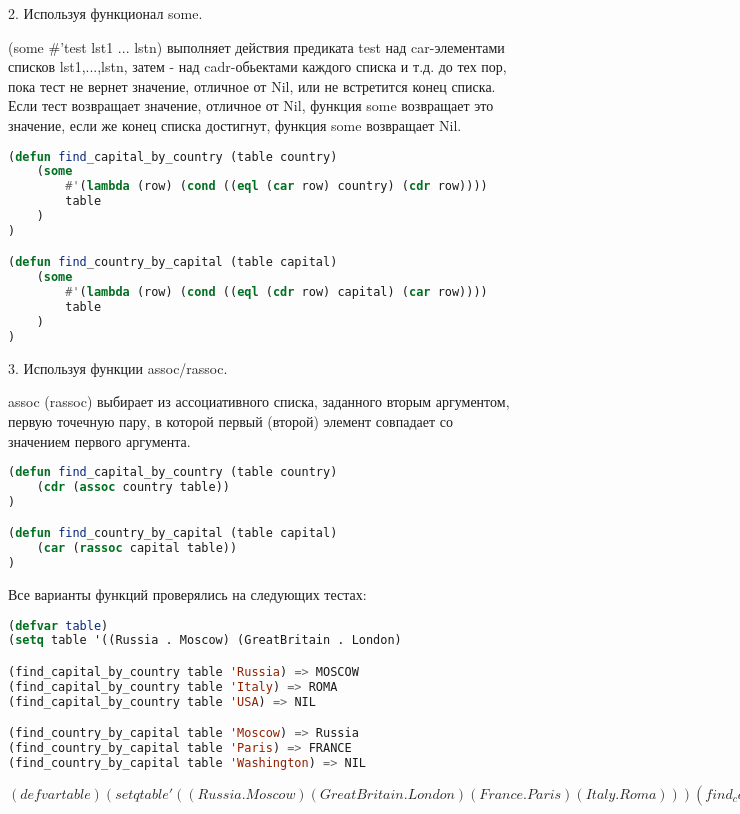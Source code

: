 \documentclass[12pt]{report}
\begin{document}
2. Используя функционал some.

(some \#'test lst1 ... lstn) выполняет действия предиката test над car-элементами списков lst1,...,lstn, затем - над cadr-обьектами каждого  списка и т.д. до тех пор, пока тест не вернет значение, отличное от Nil, или не встретится конец списка. Если тест возвращает значение, отличное от Nil, функция some возвращает это значение, если же конец списка достигнут, функция some возвращает Nil.

\begin{lstlisting}[language=Lisp]
(defun find_capital_by_country (table country)
	(some 
		#'(lambda (row) (cond ((eql (car row) country) (cdr row)))) 
		table
	) 
)

(defun find_country_by_capital (table capital)
	(some 
		#'(lambda (row) (cond ((eql (cdr row) capital) (car row)))) 
		table
	) 
)
\end{lstlisting}


3. Используя функции assoc/rassoc.

assoc (rassoc) выбирает из ассоциативного списка, заданного вторым аргументом, первую точечную пару, в которой первый (второй) элемент совпадает со значением первого аргумента. 

\begin{lstlisting}[language=Lisp]
(defun find_capital_by_country (table country)
	(cdr (assoc country table))
)

(defun find_country_by_capital (table capital)
	(car (rassoc capital table))
)
\end{lstlisting}

Все варианты функций проверялись на следующих тестах:
\begin{lstlisting}[language=Lisp]
(defvar table)
(setq table '((Russia . Moscow) (GreatBritain . London)                  (France . Paris) (Italy . Roma)))

(find_capital_by_country table 'Russia) => MOSCOW
(find_capital_by_country table 'Italy) => ROMA
(find_capital_by_country table 'USA) => NIL

(find_country_by_capital table 'Moscow) => Russia
(find_country_by_capital table 'Paris) => FRANCE
(find_country_by_capital table 'Washington) => NIL
\end{lstlisting}

$
(defvar table)
(setq table '((Russia . Moscow) (GreatBritain . London)                  (France . Paris) (Italy . Roma)))
(find_capital_by_country table 'Russia)
(find_capital_by_country table 'Italy)
(find_capital_by_country table 'USA)
(find_country_by_capital table 'Moscow)
(find_country_by_capital table 'Paris)
(find_country_by_capital table 'Washington)
$
\fi
\end{document}
